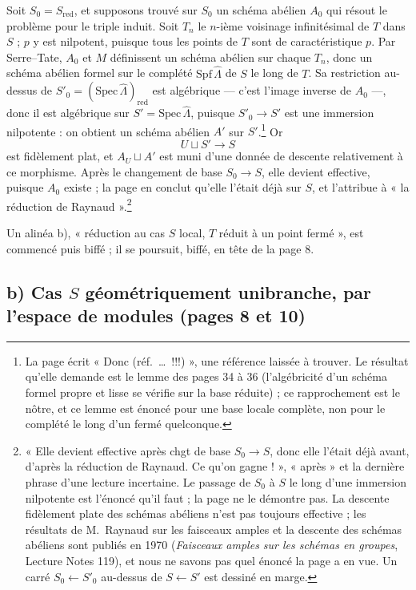 \documentclass[11pt,a4paper]{article}
\begin{document}
Soit $S_0 = S_{\mathrm{red}}$, et supposons trouvé sur $S_0$ un schéma abélien
$A_0$ qui résout le problème pour le triple induit. Soit $T_n$ le $n$-ième
voisinage infinitésimal de $T$ dans $S$ ; $p$ y est nilpotent, puisque tous
les points de $T$ sont de caractéristique $p$. Par Serre--Tate, $A_0$ et $M$
définissent un schéma abélien sur chaque $T_n$, donc un schéma abélien formel
sur le complété $\mathrm{Spf}\,\hat\Lambda$ de $S$ le long de $T$. Sa
restriction au-dessus de $S'_0 = (\mathrm{Spec}\,\hat\Lambda)_{\mathrm{red}}$
est algébrique --- c'est l'image inverse de $A_0$ ---, donc il est algébrique
sur $S' = \mathrm{Spec}\,\hat\Lambda$, puisque $S'_0 \to S'$ est une immersion
nilpotente : on obtient un schéma abélien $A'$ sur $S'$.\footnote{La page
écrit « Donc (réf.\ \ldots\ !!!) », une référence laissée à trouver. Le
résultat qu'elle demande est le lemme des pages 34 à 36 (l'algébricité d'un
schéma formel propre et lisse se vérifie sur la base réduite) ; ce
rapprochement est le nôtre, et ce lemme est énoncé pour une base locale
complète, non pour le complété le long d'un fermé quelconque.} Or
\[
  U \sqcup S' \longrightarrow S
\]
est fidèlement plat, et $A_U \sqcup A'$ est muni d'une donnée de descente
relativement à ce morphisme. Après le changement de base $S_0 \to S$, elle
devient effective, puisque $A_0$ existe ; la page en conclut qu'elle l'était
déjà sur $S$, et l'attribue à « la réduction de Raynaud ».\footnote{« Elle
devient effective après chgt de base $S_0 \to S$, donc elle l'était déjà
avant, d'après la réduction de Raynaud. Ce qu'on gagne ! », « après » et la
dernière phrase d'une lecture incertaine. Le passage de $S_0$ à $S$ le long
d'une immersion nilpotente est l'énoncé qu'il faut ; la page ne le démontre
pas. La descente fidèlement plate des schémas abéliens n'est pas
toujours effective ; les résultats de M.~Raynaud sur les faisceaux amples et
la descente des schémas abéliens sont publiés en 1970 (\emph{Faisceaux amples
sur les schémas en groupes}, Lecture Notes 119), et nous ne savons pas quel
énoncé la page a en vue. Un carré $S_0 \leftarrow S'_0$ au-dessus de
$S \leftarrow S'$ est dessiné en marge.}

Un alinéa b), « réduction au cas $S$ local, $T$ réduit à un point fermé »,
est commencé puis biffé ; il se poursuit, biffé, en tête de la page 8.

\subsection*{b) Cas $S$ géométriquement unibranche, par l'espace de modules (pages 8 et 10)}
\end{document}

